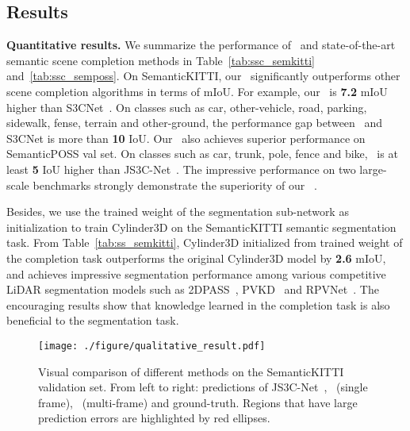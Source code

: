 \documentclass[10pt,twocolumn,letterpaper]{article}
\begin{document}
\subsection{Results}

\noindent \textbf{Quantitative results.} We summarize the performance of \algorithmname~and state-of-the-art semantic scene completion methods in Table~\ref{tab:ssc_semkitti} and~\ref{tab:ssc_semposs}. On SemanticKITTI, our \algorithmname~significantly outperforms other scene completion algorithms in terms of mIoU. For example, our \algorithmname~is \textbf{7.2} mIoU higher than S3CNet~\cite{s3cnet}. On classes such as car, other-vehicle, road, parking, sidewalk, fense, terrain and other-ground, the performance gap between \algorithmname~and S3CNet is more than \textbf{10} IoU. Our \algorithmname~also achieves superior performance on SemanticPOSS val set. On classes such as car, trunk, pole, fence and bike, \algorithmname~is at least \textbf{5} IoU higher than JS3C-Net~\cite{js3cnet}. The impressive performance on two large-scale benchmarks strongly demonstrate the superiority of our \algorithmname~.

Besides, we use the trained weight of the segmentation sub-network as initialization to train Cylinder3D on the SemanticKITTI semantic segmentation task. From Table~\ref{tab:ss_semkitti}, Cylinder3D initialized from trained weight of the completion task outperforms the original Cylinder3D model by \textbf{2.6} mIoU, and achieves impressive segmentation performance among various competitive LiDAR segmentation models such as 2DPASS~\cite{yan20222dpass}, PVKD~\cite{pvkd2022} and RPVNet~\cite{rpvnet}. The encouraging results show that knowledge learned in the completion task is also beneficial to the segmentation task.


\begin{figure*}[t]
 \centering
 \texttt{[image: ./figure/qualitative\_result.pdf]}
 \vskip -0.1cm
 \caption{Visual comparison of different methods on the SemanticKITTI validation set. From left to right: predictions of JS3C-Net~\cite{js3cnet}, \algorithmname~(single frame), \algorithmname~(multi-frame) and ground-truth. Regions that have large prediction errors are highlighted by red ellipses.}
 \centering
 \vskip -0.2cm
 \label{fig:visual_compare}
\end{figure*}
\end{document}
